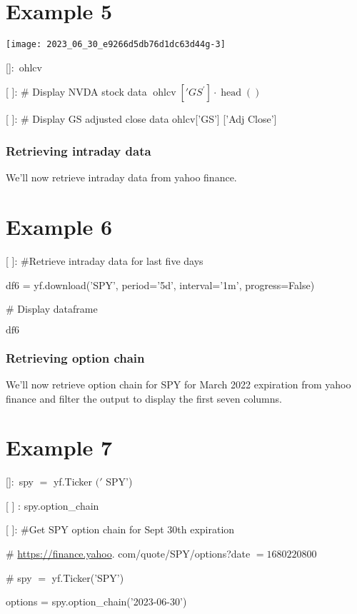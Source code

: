 \documentclass[10pt]{article}
\begin{document}
\section*{Example 5}
\begin{center}
\texttt{[image: 2023\_06\_30\_e9266d5db76d1dc63d44g-3]}
\end{center}

[]$:$ ohlcv

[ ]: \# Display NVDA stock data $\operatorname{ohlcv}\left[' G S^{\prime}\right] \cdot \operatorname{head}()$

[ ]: \# Display GS adjusted close data ohlcv['GS'] ['Adj Close']

\subsubsection*{Retrieving intraday data}
We'll now retrieve intraday data from yahoo finance.

\section*{Example 6}
[ ]: \#Retrieve intraday data for last five days

df6 = yf.download('SPY', period='5d', interval='1m', progress=False)

\# Display dataframe

$\mathrm{df} 6$

\subsubsection*{Retrieving option chain}
We'll now retrieve option chain for SPY for March 2022 expiration from yahoo finance and filter the output to display the first seven columns.

\section*{Example 7}
[]$:$ spy $=$ yf.Ticker $('$ SPY')

[ ] : spy.option\_chain

[ ]: \#Get SPY option chain for Sept 30th expiration

\# \href{https://finance.yahoo}{https://finance.yahoo}. com/quote/SPY/options?date $=1680220800$

\# spy $=$ yf.Ticker('SPY')

options = spy.option\_chain('2023-06-30')
\end{document}
